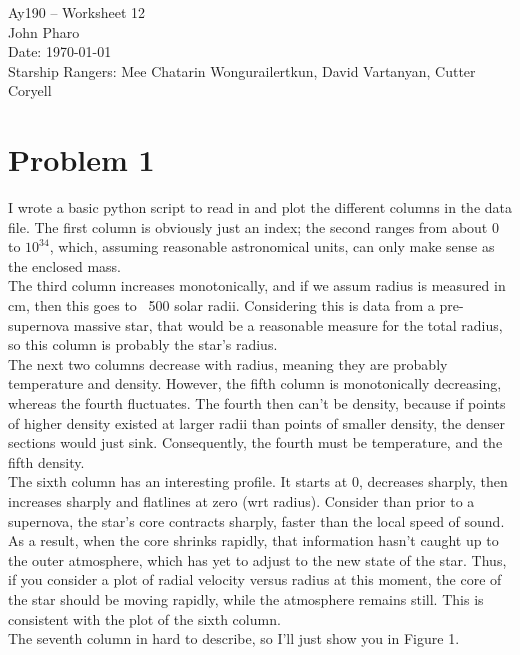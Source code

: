 \documentclass[11pt,letterpaper]{article}
\begin{document}
\begin{center}
\Large
Ay190 -- Worksheet 12\\
John Pharo\\
Date: \today\\
Starship Rangers: Mee Chatarin Wongurailertkun, David Vartanyan, Cutter Coryell
\end{center}

\section*{Problem 1}

I wrote a basic python script to read in and plot the different columns in the data file. The first column is obviously just an index; the second ranges from about 0 to $10^{34}$, which, assuming reasonable astronomical units, can only make sense as the enclosed mass. \\

The third column increases monotonically, and if we assum radius is measured in cm, then this goes to ~500 solar radii. Considering this is data from a pre-supernova massive star, that would be a reasonable measure for the total radius, so this column is probably the star's radius. \\

The next two columns decrease with radius, meaning they are probably temperature and density. However, the fifth column is monotonically decreasing, whereas the fourth fluctuates. The fourth then can't be density, because if points of higher density existed at larger radii than points of smaller density, the denser sections would just sink. Consequently, the fourth must be temperature, and the fifth density. \\

The sixth column has an interesting profile. It starts at 0, decreases sharply, then increases sharply and flatlines at zero (wrt radius). Consider than prior to a supernova, the star's core contracts sharply, faster than the local speed of sound. As a result, when the core shrinks rapidly, that information hasn't caught up to the outer atmosphere, which has yet to adjust to the new state of the star. Thus, if you consider a plot of radial velocity versus radius at this moment, the core of the star should be moving rapidly, while the atmosphere remains still. This is consistent with the plot of the sixth column. \\

The seventh column in hard to describe, so I'll just show you in Figure 1. \\
\end{document}
